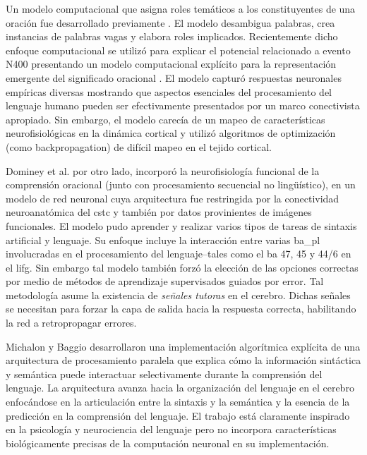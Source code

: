 {Un modelo computacional que asigna roles temáticos a los constituyentes de una oración fue desarrollado previamente \cite{STJOHN1990217}.
El modelo desambigua palabras, crea instancias de palabras vagas y elabora roles implicados.
Recientemente dicho enfoque computacional se utilizó para explicar el potencial relacionado a evento N400 presentando un modelo computacional explícito para la representación emergente del significado oracional \cite{rabovsky_modelling_2018}.
El modelo capturó respuestas neuronales empíricas diversas mostrando que aspectos esenciales del procesamiento del lenguaje humano pueden ser efectivamente presentados por un marco conectivista apropiado.
Sin embargo, el modelo carecía de un mapeo de características neurofisiológicas en la dinámica cortical y utilizó algoritmos de optimización (como backpropagation) de difícil mapeo en el tejido cortical.

Dominey et al. \cite{Dominey2009NeuralNP} por otro lado, incorporó la neurofisiología funcional de la comprensión oracional (junto con procesamiento secuencial no lingüístico), en un modelo de red neuronal cuya arquitectura fue restringida por la conectividad neuroanatómica del \gls{cstc} y también por datos provinientes de imágenes funcionales. 
El modelo pudo aprender y realizar varios tipos de tareas de sintaxis artificial y lenguaje.
Su enfoque incluye la interacción entre varias \gls{ba_pl} involucradas en el procesamiento del lenguaje--tales como el \gls{ba} 47, 45 y 44/6 en el \gls{lifg}.
Sin embargo tal modelo también forzó la elección de las opciones correctas por medio de métodos de aprendizaje supervisados guiados por error.
Tal metodología asume la existencia de \emph{señales tutoras} en el cerebro. Dichas señales se necesitan para forzar la capa de salida hacia la respuesta correcta, habilitando la red a retropropagar errores.

Michalon y Baggio \cite{michalon_meaning-driven_2019} desarrollaron una implementación algorítmica explícita de una arquitectura de procesamiento paralela que explica cómo la información sintáctica y semántica puede interactuar selectivamente durante la comprensión del lenguaje.
La arquitectura avanza hacia la organización del lenguaje en el cerebro enfocándose en la articulación entre la sintaxis y la semántica y la esencia de la predicción en la comprensión del lenguaje.
El trabajo está claramente inspirado en la psicología y neurociencia del lenguaje pero no incorpora características biológicamente precisas de la computación neuronal en su implementación.


}
